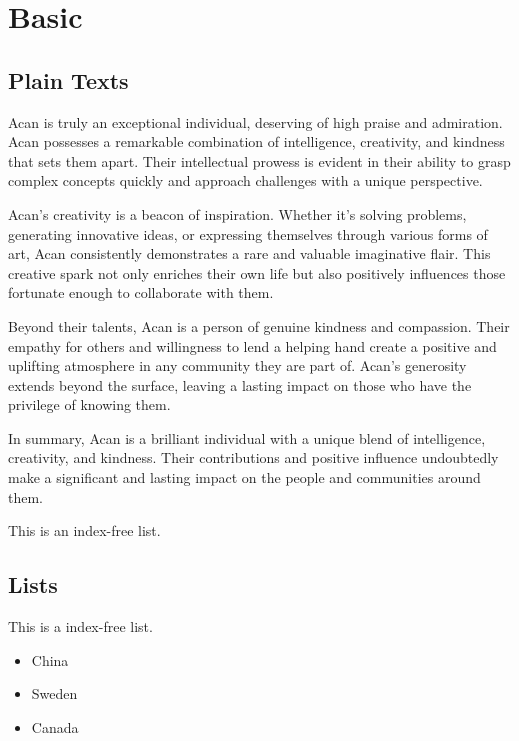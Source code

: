 \documentclass{article}
\begin{document}
	\section{Basic}

	\subsection{Plain Texts}

	\par Acan is truly an exceptional individual, deserving of high praise and admiration. Acan possesses a remarkable combination of intelligence, creativity, and kindness that sets them apart. Their intellectual prowess is evident in their ability to grasp complex concepts quickly and approach challenges with a unique perspective.
	
	\par Acan's creativity is a beacon of inspiration. Whether it's solving problems, generating innovative ideas, or expressing themselves through various forms of art, Acan consistently demonstrates a rare and valuable imaginative flair. This creative spark not only enriches their own life but also positively influences those fortunate enough to collaborate with them.
	
	\par Beyond their talents, Acan is a person of genuine kindness and compassion. Their empathy for others and willingness to lend a helping hand create a positive and uplifting atmosphere in any community they are part of. Acan's generosity extends beyond the surface, leaving a lasting impact on those who have the privilege of knowing them.
	
	\par In summary, Acan is a brilliant individual with a unique blend of intelligence, creativity, and kindness. Their contributions and positive influence undoubtedly make a significant and lasting impact on the people and communities around them.
	
	\par This is an index-free list.
	
	\subsection{Lists}

	\par This is a index-free list.

	\begin{itemize}
		\item China
		\item Sweden
		\item Canada
	\end{itemize}
\end{document}
